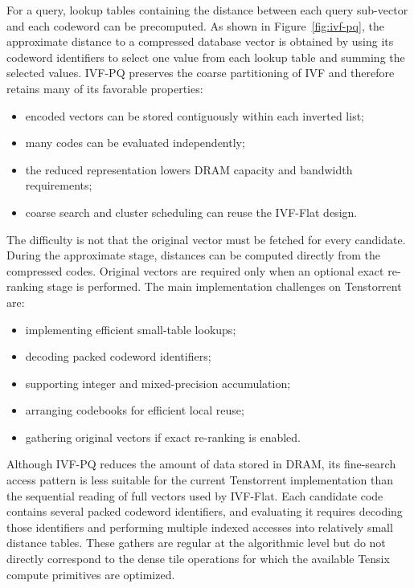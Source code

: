 For a query, lookup tables containing the distance between each query sub-vector and each codeword can be precomputed. As shown in Figure~\ref{fig:ivf-pq}, the approximate distance to a compressed database vector is obtained by using its codeword identifiers to select one value from each lookup table and summing the selected values.
\newline
IVF-PQ preserves the coarse partitioning of IVF and therefore retains many of its favorable properties:
\begin{itemize}
\item encoded vectors can be stored contiguously within each inverted list;
\item many codes can be evaluated independently;
\item the reduced representation lowers DRAM capacity and bandwidth requirements;
\item coarse search and cluster scheduling can reuse the IVF-Flat design.
\end{itemize}

The difficulty is not that the original vector must be fetched for every candidate. During the approximate stage, distances can be computed directly from the compressed codes. Original vectors are required only when an optional exact re-ranking stage is performed.
\newline
The main implementation challenges on Tenstorrent are:
\begin{itemize}
\item implementing efficient small-table lookups;
\item decoding packed codeword identifiers;
\item supporting integer and mixed-precision accumulation;
\item arranging codebooks for efficient local reuse;
\item gathering original vectors if exact re-ranking is enabled.
\end{itemize}

Although IVF-PQ reduces the amount of data stored in DRAM, its fine-search access pattern is less suitable for the current Tenstorrent implementation than the sequential reading of full vectors used by IVF-Flat. Each candidate code contains several packed codeword identifiers, and evaluating it requires decoding those identifiers and performing multiple indexed accesses into relatively small distance tables. These gathers are regular at the algorithmic level but do not directly correspond to the dense tile operations for which the available Tensix compute primitives are optimized.

